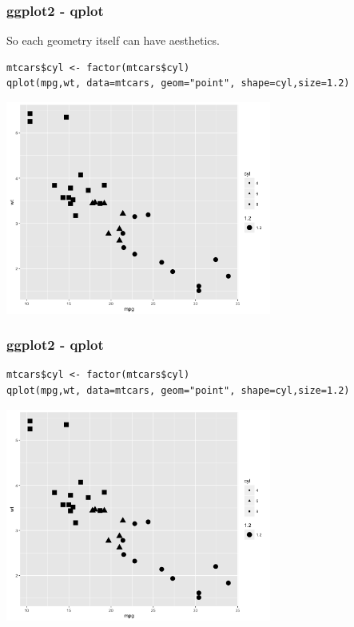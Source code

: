 \documentclass{beamer}
\begin{document}

\begin{frame}[fragile]
\frametitle{ggplot2 - qplot}So each geometry itself can have aesthetics.
\scriptsize
\begin{verbatim}
mtcars$cyl <- factor(mtcars$cyl)
qplot(mpg,wt, data=mtcars, geom="point", shape=cyl,size=1.2)
\end{verbatim}
\begin{center}
\includegraphics[height=7cm]{../IMG/qplot_geom_line.png}
\end{center}
\end{frame}


%

\begin{frame}[fragile]
\frametitle{ggplot2 - qplot}
\scriptsize
\begin{verbatim}
mtcars$cyl <- factor(mtcars$cyl)
qplot(mpg,wt, data=mtcars, geom="point", shape=cyl,size=1.2)
\end{verbatim}
\begin{center}
\includegraphics[height=7cm]{../IMG/qplot_geom_line.png}
\end{center}
\end{frame}
\end{document}
